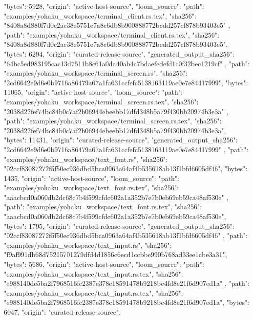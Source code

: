{{      "bytes": 5928,
      "origin": "active-host-source",
      "loom_source": {
        "path": "examples/yohaku_workspace/terminal_client.rs.tex",
        "sha256": "8408a8d880f7d0c2ac38e5751e7a8c6db8b900888772bedd257cf878b93403e5"
      }
    },
    {
      "path": "examples/yohaku_workspace/terminal_client.rs.tex",
      "sha256": "8408a8d880f7d0c2ac38e5751e7a8c6db8b900888772bedd257cf878b93403e5",
      "bytes": 6294,
      "origin": "curated-release-source",
      "generated_output_sha256": "64bc5ed983195cac13d7511b8c61a0da40ab4c7bdaefedefd1c0f32bec1219cf"
    },
    {
      "path": "examples/yohaku_workspace/terminal_screen.rs",
      "sha256": "2cd6642e9d6e0b9716a86479a67a1fa631ccfefc5138163119ae0e7e84417999",
      "bytes": 11065,
      "origin": "active-host-source",
      "loom_source": {
        "path": "examples/yohaku_workspace/terminal_screen.rs.tex",
        "sha256": "2038d22fef74bc84b0c7af2b06944ebeebb17dfd348b5a79f430bb20974b3e3a"
      }
    },
    {
      "path": "examples/yohaku_workspace/terminal_screen.rs.tex",
      "sha256": "2038d22fef74bc84b0c7af2b06944ebeebb17dfd348b5a79f430bb20974b3e3a",
      "bytes": 11431,
      "origin": "curated-release-source",
      "generated_output_sha256": "2cd6642e9d6e0b9716a86479a67a1fa631ccfefc5138163119ae0e7e84417999"
    },
    {
      "path": "examples/yohaku_workspace/text_font.rs",
      "sha256": "02ccf83087272f5f50ec936dbd5bca0963a64af4b535618ab13f1bfd6605df46",
      "bytes": 1435,
      "origin": "active-host-source",
      "loom_source": {
        "path": "examples/yohaku_workspace/text_font.rs.tex",
        "sha256": "aaacbcd0a060db2dc68c7b4f599cfdc602a1a352b7e7b0eb69eb59ca48af530e"
      }
    },
    {
      "path": "examples/yohaku_workspace/text_font.rs.tex",
      "sha256": "aaacbcd0a060db2dc68c7b4f599cfdc602a1a352b7e7b0eb69eb59ca48af530e",
      "bytes": 1795,
      "origin": "curated-release-source",
      "generated_output_sha256": "02ccf83087272f5f50ec936dbd5bca0963a64af4b535618ab13f1bfd6605df46"
    },
    {
      "path": "examples/yohaku_workspace/text_input.rs",
      "sha256": "f9af991db68d75215701279dfd4d1856c6ecd1ccbbe990b768ad33ee1cbe3a31",
      "bytes": 5686,
      "origin": "active-host-source",
      "loom_source": {
        "path": "examples/yohaku_workspace/text_input.rs.tex",
        "sha256": "e988140de5ba2f7968516fc2387e378c18591478b9218bc4fd8e21f6d907ed1a"
      }
    },
    {
      "path": "examples/yohaku_workspace/text_input.rs.tex",
      "sha256": "e988140de5ba2f7968516fc2387e378c18591478b9218bc4fd8e21f6d907ed1a",
      "bytes": 6047,
      "origin": "curated-release-source",
}}
